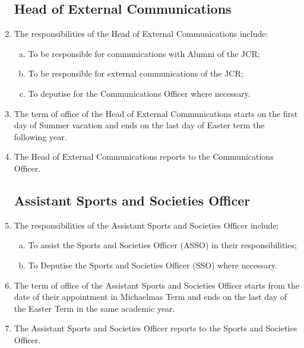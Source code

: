 \documentclass[12pt]{article}
\begin{document}
\begin{enumerate}
    \subsection{Head of External Communications}
    \item The responsibilities of the Head of External Communications include:
    \begin{enumerate} [(a)]
        \item  To be responsible for communications with Alumni of the JCR;
        \item  To be responsible for external communications of the JCR;
        \item To deputise for the Communications Officer where necessary.
    \end{enumerate}
    \item The term of office of the Head of External Communications starts on the first day of Summer vacation and ends on the last day of Easter term the following year.
    \item The Head of External Communications reports to the Communications Officer.

        \subsection{Assistant Sports and Societies Officer}
    \item The responsibilities of the Assistant Sports and Societies Officer include:
    \begin{enumerate} [(a)]
        \item To assist the Sports and Societies Officer (ASSO) in their responsibilities;
        \item To Deputise the Sports and Societies Officer (SSO) where necessary.
    \end{enumerate}
    \item The term of office of the Assistant Sports and Societies Officer starts from the date of their appointment in Michaelmas Term and ends on the last day of the Easter Term in the same academic year. 
    \item The Assistant Sports and Societies Officer reports to the Sports and Societies Officer.
\end{enumerate}
\newpage
\end{document}
